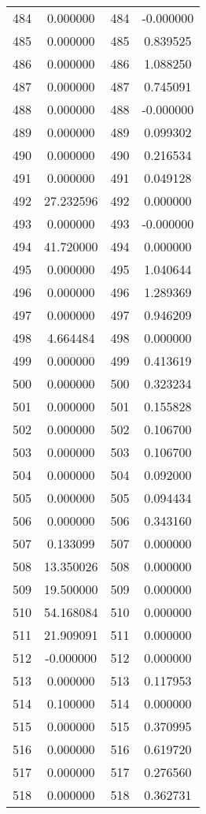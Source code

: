 \documentclass[12pt]{article}
\begin{document}
\begin{longtable}{@{}cccc@{}}
484 & 0.000000 & 484 & -0.000000 \\
485 & 0.000000 & 485 & 0.839525 \\
486 & 0.000000 & 486 & 1.088250 \\
487 & 0.000000 & 487 & 0.745091 \\
488 & 0.000000 & 488 & -0.000000 \\
489 & 0.000000 & 489 & 0.099302 \\
490 & 0.000000 & 490 & 0.216534 \\
491 & 0.000000 & 491 & 0.049128 \\
492 & 27.232596 & 492 & 0.000000 \\
493 & 0.000000 & 493 & -0.000000 \\
494 & 41.720000 & 494 & 0.000000 \\
495 & 0.000000 & 495 & 1.040644 \\
496 & 0.000000 & 496 & 1.289369 \\
497 & 0.000000 & 497 & 0.946209 \\
498 & 4.664484 & 498 & 0.000000 \\
499 & 0.000000 & 499 & 0.413619 \\
500 & 0.000000 & 500 & 0.323234 \\
501 & 0.000000 & 501 & 0.155828 \\
502 & 0.000000 & 502 & 0.106700 \\
503 & 0.000000 & 503 & 0.106700 \\
504 & 0.000000 & 504 & 0.092000 \\
505 & 0.000000 & 505 & 0.094434 \\
506 & 0.000000 & 506 & 0.343160 \\
507 & 0.133099 & 507 & 0.000000 \\
508 & 13.350026 & 508 & 0.000000 \\
509 & 19.500000 & 509 & 0.000000 \\
510 & 54.168084 & 510 & 0.000000 \\
511 & 21.909091 & 511 & 0.000000 \\
512 & -0.000000 & 512 & 0.000000 \\
513 & 0.000000 & 513 & 0.117953 \\
514 & 0.100000 & 514 & 0.000000 \\
515 & 0.000000 & 515 & 0.370995 \\
516 & 0.000000 & 516 & 0.619720 \\
517 & 0.000000 & 517 & 0.276560 \\
518 & 0.000000 & 518 & 0.362731 \\

\end{longtable}
\end{document}
